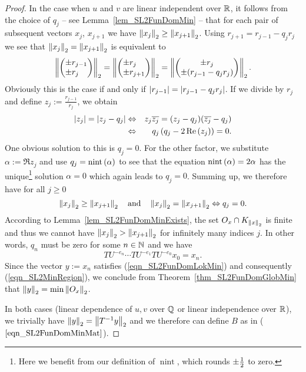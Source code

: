 \begin{proof}
In the case when $u$ and $v$ are linear independent over $\mathbb{R}$, it follows from the choice of $q_j$ -- see Lemma~\ref{lem_SL2FunDomMin} -- that for each pair of subsequent vectors $x_j$, $x_{j+1}$ we have $\left\| x_j \right\|_2 \ge \left\| x_{j+1} \right\|_2$. Using $r_{j+1} = r_{j-1} - q_j r_j$ we see that $\left\| x_j \right\|_2 = \left\| x_{j+1} \right\|_2$ is equivalent to
\begin{equation*}
\left\| \begin{pmatrix}\pm r_{j-1} \\ \pm r_{j\phantom{-1}}\end{pmatrix} \right\|_2 = 
\left\| \begin{pmatrix}\pm r_{j\phantom{+1}} \\ \pm r_{j+1}\end{pmatrix} \right\|_2 =
\left\| \begin{pmatrix}\pm r_j \\ \pm (r_{j-1} - q_j r_j)\end{pmatrix} \right\|_2.
\end{equation*}
Obviously this is the case if and only if $\left|r_{j-1}\right| = \left|r_{j-1}-q_j r_j\right|$. If we divide by $r_j$ and define $z_j := \frac{r_{j-1}}{r_j}$, we obtain
\begin{eqnarray*}
\left|z_j\right| = \left|z_j - q_j\right| 
&\Leftrightarrow& z_j \overline{z_j} = (z_j - q_j)(\overline{z_j} -q_j)\\
&\Leftrightarrow& q_j \left(q_j - 2\operatorname{Re}\left(z_j\right)\right) = 0.
\end{eqnarray*}
One obvious solution to this is $q_j = 0$. For the other factor, we substitute $\alpha := \Re{z_j}$ and use $q_j = \operatorname{nint}\left( \alpha \right)$ to see that the equation $\operatorname{nint}\left( \alpha \right) = 2 \alpha$ has the unique\footnote{Here we benefit from our definition of $\operatorname{nint}$, which rounds $\pm \frac{1}{2}$ to zero.} solution $\alpha = 0$ which again leads to $q_j = 0$. Summing up, we therefore have for all $j \ge 0$
\begin{equation}
\label{eqn_SL2FunDomAlgNormDec}
\left\| x_j \right\|_2 \ge \left\| x_{j+1} \right\|_2 
\quad \text{and} \quad
\left\| x_j \right\|_2 = \left\| x_{j+1} \right\|_2 \Leftrightarrow q_j = 0.
\end{equation}
According to Lemma~{\ref{lem_SL2FunDomMinExists}}, the set $O_x \cap K_{\left\| x \right\|_2}$ is finite and thus we cannot have $\left\| x_j \right\|_2 > \left\| x_{j+1} \right\|_2$ for infinitely many indices $j$. In other words, $q_n$ must be zero for some $n \in \mathbb{N}$ and we have
\begin{equation*}
TU^{-e_n} \cdots TU^{-e_1} TU^{-e_0} x_0 = x_n.
\end{equation*}
Since the vector $y := x_n$ satisfies (\ref{eqn_SL2FunDomLokMin}) and consequently ({\ref{eqn_SL2MinRegion}}), we conclude from  Theorem~\ref{thm_SL2FunDomGlobMin} that $\left\| y \right\|_2 = \min{\left\| O_x \right\|_2}$. 

In both cases (linear dependence of $u,v$ over $\mathbb{Q}$ or linear independence over $\mathbb{R}$), we trivially have $\left\| y \right\|_2 = \left\| {T}^{-1}y \right\|_2$ and we therefore can define $B$ as in ($\ref{eqn_SL2FunDomMinMat}$).
\end{proof}

